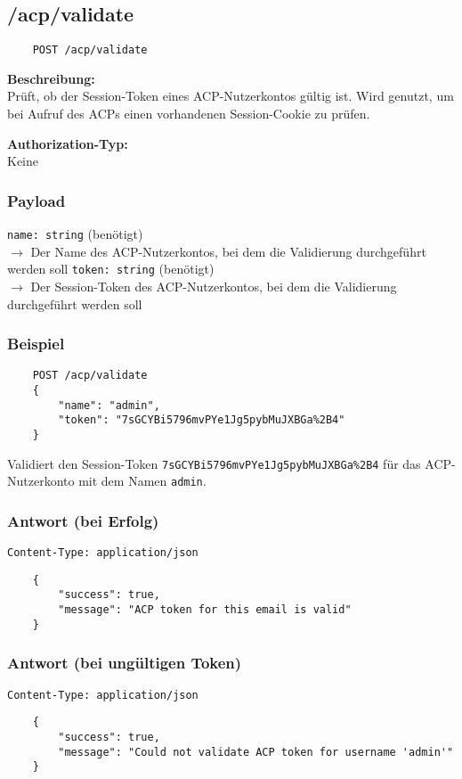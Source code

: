 \subsection{/acp/validate}

\begin{lstlisting}
    POST /acp/validate
\end{lstlisting}

\textbf{Beschreibung:} \\
Prüft, ob der Session-Token eines ACP-Nutzerkontos gültig ist. Wird genutzt, um bei Aufruf des ACPs einen vorhandenen Session-Cookie zu prüfen.

\textbf{Authorization-Typ:} \\
Keine

\subsubsection{Payload}

\lstinline{name: string} (benötigt) \\
$\rightarrow$ Der Name des ACP-Nutzerkontos, bei dem die Validierung durchgeführt werden soll
\lstinline{token: string} (benötigt) \\
$\rightarrow$ Der Session-Token des ACP-Nutzerkontos, bei dem die Validierung durchgeführt werden soll

\subsubsection{Beispiel}

\begin{lstlisting}
    POST /acp/validate
    {
        "name": "admin",
        "token": "7sGCYBi5796mvPYe1Jg5pybMuJXBGa%2B4"
    }
\end{lstlisting}

Validiert den Session-Token \lstinline{7sGCYBi5796mvPYe1Jg5pybMuJXBGa%2B4} für das ACP-Nutzerkonto mit dem Namen \lstinline{admin}.

\subsubsection{Antwort (bei Erfolg)}

\lstinline{Content-Type: application/json}
\begin{lstlisting}
    {
        "success": true, 
        "message": "ACP token for this email is valid"
    }
\end{lstlisting}

\subsubsection{Antwort (bei ungültigen Token)}

\lstinline{Content-Type: application/json}
\begin{lstlisting}
    {
        "success": true, 
        "message": "Could not validate ACP token for username 'admin'"
    }
\end{lstlisting}
